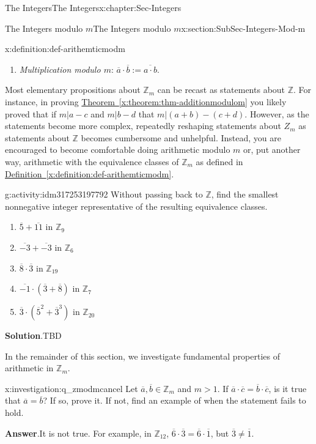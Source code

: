 \documentclass[oneside,10pt,]{book}
\newcommand{\blocktitlefont}{\relax}
\newcommand{\xreffont}{\relax}
\numberwithin{equation}{section}
\def\Z{{\mathbb Z}}
\begin{document}
\begin{chapterptx}{The Integers}{}{The Integers}{}{}{x:chapter:Sec-Integers}
\begin{sectionptx}{The Integers modulo \(m\)}{}{The Integers modulo \(m\)}{}{}{x:section:SubSec-Integers-Mod-m}
\begin{definition}{}{x:definition:def-arithemticmodm}
\begin{enumerate}
\begin{aside}{}{g:aside:idm317253201280}
\end{aside}
%
\item{}\emph{Multiplication modulo \(m\)}: \(\overline{a}\cdot \overline{b} := \overline{a\cdot b}\).%
\end{enumerate}
%
\end{definition}
Most elementary propositions about \(\Z_m\) can be recast as statements about \(\Z\). For instance, in proving \hyperref[x:theorem:thm-additionmodulom]{Theorem~{\xreffont\ref{x:theorem:thm-additionmodulom}}} you likely proved that if \(m|a-c\) and \(m|b-d\) that \(m|(a+b)-(c+d)\). However, as the statements become more complex, repeatedly reshaping statements about \(Z_m\) as statements about \(\Z\) becomes cumbersome and unhelpful. Instead, you are encouraged to become comfortable doing arithmetic modulo \(m\) or, put another way, arithmetic with the equivalence classes of \(\Z_m\) as defined in \hyperref[x:definition:def-arithemticmodm]{Definition~{\xreffont\ref{x:definition:def-arithemticmodm}}}.%
\begin{activity}{}{g:activity:idm317253197792}%
Without passing back to \(\Z\), find the smallest nonnegative integer representative of the resulting equivalence classes.%
%
\begin{enumerate}
\item{}\(\overline{5}+\overline{11}\) in \(\Z_{9}\)%
\item{}\(\overline{-3}+\overline{-3}\) in \(\Z_{6}\)%
\item{}\(\overline{8}\cdot\overline{3}\) in \(\Z_{19}\)%
\item{}\(\overline{-1}\cdot(\overline{3}+\overline{8})\) in \(\Z_{7}\)%
\item{}\(\overline{3}\cdot(\overline{5}^2+\overline{3}^3)\) in \(\Z_{20}\)%
\end{enumerate}
\par\smallskip%
\noindent\textbf{\blocktitlefont Solution}.\hypertarget{g:solution:idm317253192832}{}\quad{}TBD\end{activity}
In the remainder of this section, we investigate fundamental properties of arithmetic in \(\Z_m\).%
\begin{investigation}{}{x:investigation:q_zmodmcancel}%
Let \(\overline{a},\overline{b}\in \Z_m\) and \(m > 1\). If \(\overline{a}\cdot \overline{c} = \overline{b}\cdot \overline{c}\), is it true that \(\overline{a} = \overline{b}\)? If so, prove it. If not, find an example of when the statement fails to hold.%
\par\smallskip%
\noindent\textbf{\blocktitlefont Answer}.\hypertarget{g:answer:idm317253252384}{}\quad{}It is not true. For example, in \(\Z_{12}\), \(\overline{6}\cdot \overline{3} = \overline{6}\cdot\overline{1}\), but \(\overline{3}\ne \overline{1}\).%

\end{investigation}
\end{sectionptx}
\end{chapterptx}
\end{document}

